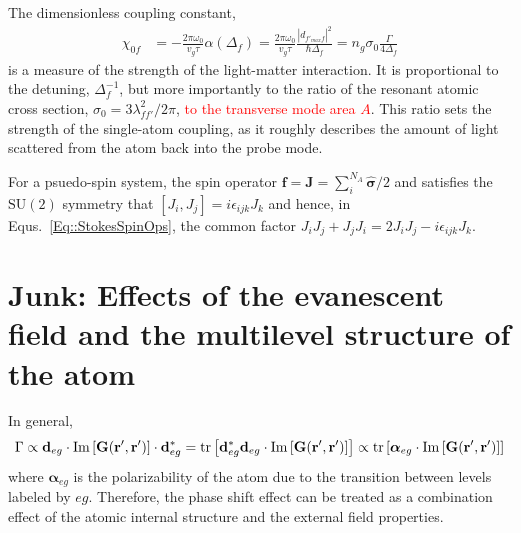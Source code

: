 \documentclass[preprint,aps,pra,onecolumn]{revtex4-1} %
\begin{document}
The dimensionless coupling constant,
\begin{align}
\chi_{0f} &= -\frac{2\pi\omega_0}{v_g\tau}\alpha(\Delta_f) =\frac{2\pi\omega_0}{v_g\tau} \frac{|d_{f'_{max}f}|^2}{\hbar \Delta_f} =n_g\sigma_0\frac{\Gamma}{4\Delta_f}
\end{align}
is a measure of the strength of the light-matter interaction.  It is proportional to the detuning, $\Delta_f^{-1}$, but more importantly to the ratio of the resonant atomic cross section, $\sigma_0 = 3 \lambda_{f f'}^2/2 \pi$, \textcolor{red}{to the transverse mode area $A$}.  This ratio sets the strength of the single-atom coupling, as it roughly describes the amount of light scattered from the atom back into the probe mode.  

For a psuedo-spin system, the spin operator $\mathbf{f}=\mathbf{J}=\sum_i^{N_A}\hat{\boldsymbol{\sigma}}/2$ and satisfies the $\mathrm{SU}(2)$ symmetry that $[J_i,J_j]=i\epsilon_{ijk}J_k$ and hence, in Equs.~\eqref{Eq::StokesSpinOps}, the common factor $J_iJ_j+J_jJ_i=2J_iJ_j-i\epsilon_{ijk}J_k$. 


\section{Junk: Effects of the evanescent field and the multilevel structure of the atom}
In general, 
\begin{align}
\Gamma \propto \mathbf{d}_{eg}\cdot \mathrm{Im}\left[\mathbf{G}(\mathbf{r}',\mathbf{r}') \right]\cdot\mathbf{d}_{eg}^*=\mathrm{tr}\left[\mathbf{d}_{eg}^*\mathbf{d}_{eg}\cdot \mathrm{Im}\left[\mathbf{G}(\mathbf{r}',\mathbf{r}') \right] \right]\propto \mathrm{tr}\left[\boldsymbol{\alpha}_{eg}\cdot \mathrm{Im}\left[\mathbf{G}(\mathbf{r}',\mathbf{r}') \right] \right]
\end{align}
where $ \boldsymbol{\alpha}_{eg} $ is the polarizability of the atom due to the transition between levels labeled by $ eg $. Therefore, the phase shift effect can be treated as a combination effect of the atomic internal structure and the external field properties. 
\end{document}
